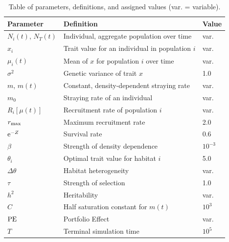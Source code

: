 \documentclass{revtex4}
\begin{document}
\begin{table}[!t]
\begin{center}
\begin{tabular}{ l l l }
\hline
Parameter & Definition & Value \\
\hline
$N_i(t)$, $N_T(t)$ & Individual, aggregate population over time & {\rm var.}\\
$x_i$ & Trait value for an individual in population $i$ & {\rm var.}\\
$\mu_i(t)$ & Mean of $x$ for population $i$ over time & {\rm var.}\\
$\sigma^2$ & Genetic variance of trait $x$ & 1.0\\
$m$, $m(t)$ & Constant, density-dependent straying rate & {\rm var.}\\
$m_0$ & Straying rate of an individual & {\rm var.}\\
$R_i[\mu(t)]$ & Recruitment rate of population $i$ & {\rm var.}\\
$r_{\rm max}$ & Maximum recruitment rate & 2.0\\
${\rm e}^{-Z}$ & Survival rate & 0.6\\
$\beta$ & Strength of density dependence & $10^{-3}$\\
$\theta_i$ & Optimal trait value for habitat $i$ & 5.0\\
$\Delta\theta$ & Habitat heterogeneity & {\rm var.}\\
$\tau$ & Strength of selection & 1.0\\
$h^2$ & Heritability & {\rm var.}\\
$C$ & Half saturation constant for $m(t)$ &  $10^3$\\
${\rm PE}$ & Portfolio Effect & {\rm var.}\\
$T$ & Terminal simulation time & $10^5$\\
\hline
\end{tabular}
\end{center}
\caption{Table of parameters, definitions, and assigned values (var. = variable).}
\end{table}


\clearpage
\end{document}
